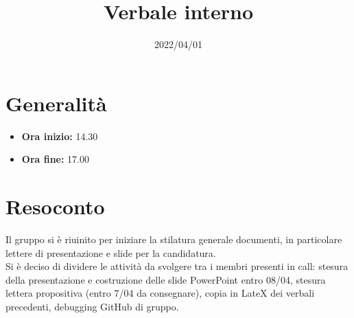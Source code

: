\documentclass{classes/base}
\title{Verbale interno}
\date{2022/04/01}
\author{\marcob}
\renewcommand{\maketitle}{
    
}
\begin{document}
    \maketitle

    \section{Generalità}
    \begin{itemize}
        \item \textbf{Ora inizio:} 14.30
        \item \textbf{Ora fine:} 17.00
    \end{itemize}
    
    \section{Resoconto}
    Il gruppo si è riuinito per iniziare la stilatura generale documenti, in particolare lettere di presentazione e slide per la candidatura.\\
    Si è deciso di dividere le attività da svolgere tra i membri presenti in call: stesura della presentazione e costruzione delle slide PowerPoint entro 08/04, stesura lettera propositiva (entro 7/04 da consegnare), copia in LateX dei verbali precedenti, debugging GitHub di gruppo.
\end{document}
